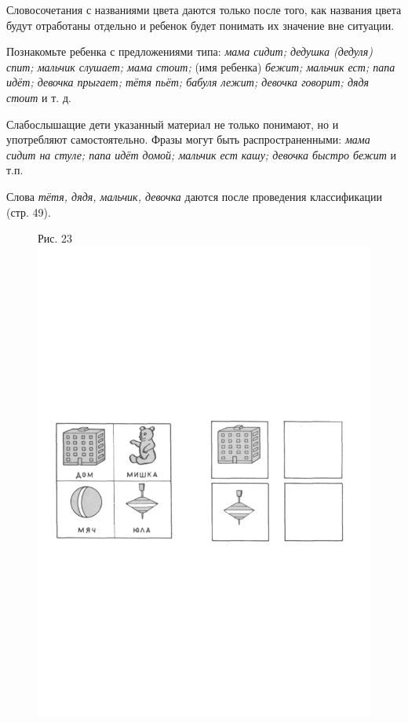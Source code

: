 \documentclass[a5paper]{book}
\renewcommand{\emph}[1]{\textit{#1}}
\begin{document}
Словосочетания с названиями цвета даются только после того, как названия
цвета будут отработаны отдельно и ребенок будет понимать их значение вне
ситуации.

Познакомьте ребенка с предложениями типа: \emph{мама сидит; дедушка
(дедуля) спит; мальчик слушает; мама стоит;} (имя ребенка) \emph{бежит;
мальчик ест; папа идёт; девочка прыгает; тётя пьёт; бабуля лежит;
девочка говорит; дядя стоит} и т. д.

Слабослышащие дети указанный материал не только понимают, но и
употребляют самостоятельно. Фразы могут быть распространенными:
\emph{мама сидит на стуле; папа идёт домой; мальчик ест кашу; девочка
быстро бежит} и т.п.

Слова \emph{тётя, дядя, мальчик, девочка} даются после проведения
классификации (стр. 49).

\begin{figure}
\centering
Рис. 23\includegraphics[width=\linewidth]{media/media/image20.png}
\end{figure}
\end{document}
